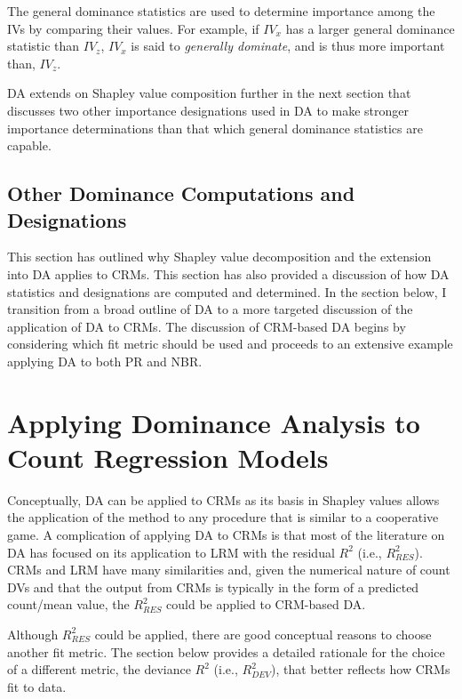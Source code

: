 \documentclass[ShortAfour,times,sageapa]{sagej}
\begin{document}
	The general dominance statistics are used to determine importance among the IVs by comparing their values.
	For example, if $IV_x$ has a larger general dominance statistic than $IV_z$, $IV_x$ is said to \emph{generally dominate}, and is thus more important than, $IV_z$.
	
	DA extends on Shapley value composition further in the next section that discusses two other importance designations used in DA to make stronger importance determinations than that which general dominance statistics are capable.
	
	\subsection{Other Dominance Computations and Designations}
	

	

	This section has outlined why Shapley value decomposition and the extension into DA applies to CRMs. 
	This section has also provided a discussion of how DA statistics and designations are computed and determined.
	In the section below, I transition from a broad outline of DA to a more targeted discussion of the application of DA to CRMs.
	The discussion of CRM-based DA begins by considering which fit metric should be used and proceeds to an extensive example applying DA to both PR and NBR.
	
\section{Applying Dominance Analysis to Count Regression Models}

	Conceptually, DA can be applied to CRMs as its basis in Shapley values allows the application of the method to any procedure that is similar to a cooperative game.
	A complication of applying DA to CRMs is that most of the literature on DA has focused on its application to LRM with the residual $R^2$ (i.e., $R^2_{RES}$).
	CRMs and LRM have many similarities and, given the numerical nature of count DVs and that the output from CRMs is typically in the form of a predicted count/mean value, the $R^2_{RES}$ could be applied to CRM-based DA.
	
	Although $R^2_{RES}$ could be applied, there are good conceptual reasons to choose another fit metric. 
	The section below provides a detailed rationale for the choice of a different metric, the deviance $R^2$ (i.e., $R^2_{DEV}$), that better reflects how CRMs fit to data. 
	
\end{document}
